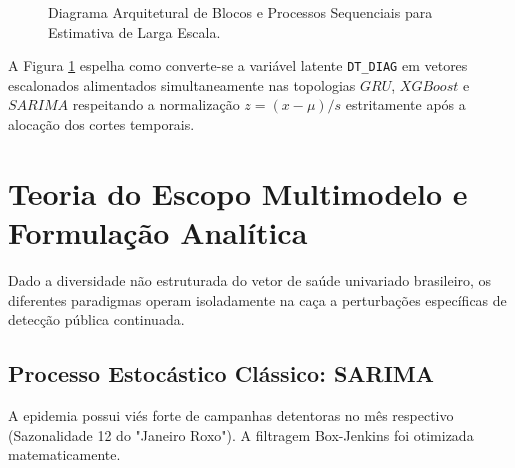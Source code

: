 \begin{figure}[htbp]
{%
}
\caption{Diagrama Arquitetural de Blocos e Processos Sequenciais para Estimativa de Larga Escala.}
\label{fig:pipeline_series_refatorado}
\end{figure}

A Figura \ref{fig:pipeline_series_refatorado} espelha como converte-se a variável latente \texttt{DT\_DIAG} em vetores escalonados alimentados simultaneamente nas topologias $GRU$, $XGBoost$ e $SARIMA$ respeitando a normalização $z = (x-\mu)/s$ estritamente após a alocação dos cortes temporais.

\section{Teoria do Escopo Multimodelo e Formulação Analítica}

Dado a diversidade não estruturada do vetor de saúde univariado brasileiro, os diferentes paradigmas operam isoladamente na caça a perturbações específicas de detecção pública continuada.

\subsection{Processo Estocástico Clássico: SARIMA}
A epidemia possui viés forte de campanhas detentoras no mês respectivo (Sazonalidade 12 do "Janeiro Roxo"). A filtragem Box-Jenkins foi otimizada matematicamente.

